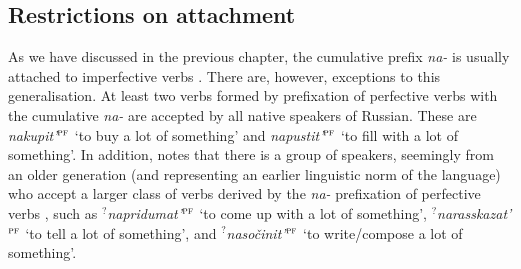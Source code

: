 \subsection{Restrictions on attachment}
As we have discussed in the previous chapter, the cumulative  prefix \textit{na-}   is usually attached to imperfective verbs . There are, however, exceptions to this generalisation. At least two verbs formed by prefixation  of perfective verbs  with the cumulative  \textit{na-}   are accepted by all native speakers of Russian. These are \textit{nakupit'}$^{\textsc{pf}}$ `to buy a lot of something' and \textit{napustit'}$^{\textsc{pf}}$ `to fill with a lot of something'. In addition, \citet{Tatevosov:13a} notes that there is a group of speakers, seemingly from an older generation (and representing an earlier linguistic norm of the language) who accept a larger class of verbs derived by the \textit{na-}  prefixation  of perfective verbs , such as \textit{$^?$napridumat'}$^{\textsc{pf}}$ `to come up with a lot of something', \textit{$^?$narasskazat'}$^{\textsc{pf}}$ `to tell a lot of something', and \textit{$^?$naso\v{c}init'}$^{\textsc{pf}}$ `to write/compose a lot of something'.

